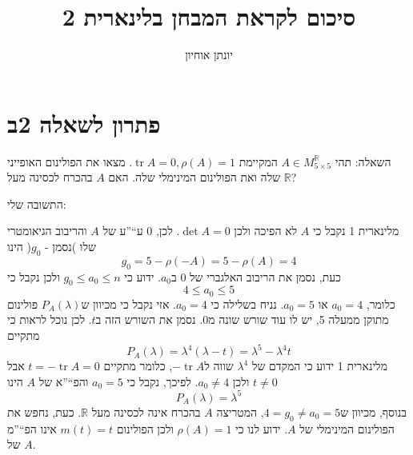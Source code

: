 \documentclass[11pt, oneside]{article}
\title{סיכום לקראת המבחן בלינארית 2}
\author{יונתן אוחיון}
\newcommand{\mR}{\mathbb{R}}
\DeclareMathOperator{\tr}{tr}
\begin{document}
\maketitle

\clearpage

\section*{פתרון לשאלה 2ב}
השאלה: תהי $A \in M_{5 \times 5}^{\mR}$ המקיימת $\tr{A} = 0, \rho(A) = 1$. מצאו את הפולינום האופייני שלה ואת הפולינום המינימלי שלה. האם $A$ בהכרח לכסינה מעל $\mR$?

התשובה שלי:

מלינארית 1 נקבל כי $A$ לא הפיכה ולכן $\det{A} = 0$. לכן, 0 ע``''ע של $A$ והריבוב הגיאומטרי שלו )נסמן - $g_{0}$( הינו
\[
g_{0} = 5 - \rho(-A) = 5 - \rho(A) = 4
\]
כעת, נסמן את הריבוב האלגברי של 0 ב$a_{0}$. ידוע כי $g_{0} \le a_{0} \le n$ ולכן נקבל כי
\[
4 \le a_{0} \le 5
\]
כלומר, $a_{0} = 4$ או $a_{0} = 5$. נניח בשלילה כי $a_{0} = 4$. אזי נקבל כי מכיוון ש$P_{A}(\lambda)$ פולינום מתוקן ממעלה 5, יש לו עוד שורש שונה מ0. נסמן את השורש הזה ב$t$. לכן נוכל לראות כי מתקיים
\[
P_{A}(\lambda) = \lambda^{4}(\lambda - t) = \lambda^{5} - \lambda^{4}t
\]
מלינארית 1 ידוע כי המקדם של $\lambda^{4}$ שווה ל$-\tr{A}$, כלומר מתקיים $t = -\tr{A} = 0$ אבל $t \neq 0$ ולכן $a_{0} \neq 4$. לפיכך, נקבל כי $a_{0} = 5$ והפ``''א של $A$ הינו
\[
P_{A}(\lambda) = \lambda^{5}
\]
בנוסף, מכיוון ש$4 = g_{0} \neq a_{0} = 5$, המטריצה $A$ בהכרח אינה לכסינה מעל $\mR$. כעת, נחפש את הפולינום המינימלי של $A$. ידוע לנו כי $\rho(A) = 1$ ולכן הפולינום $m(t) = t$ אינו הפ``''מ של $A$.
\end{document}
